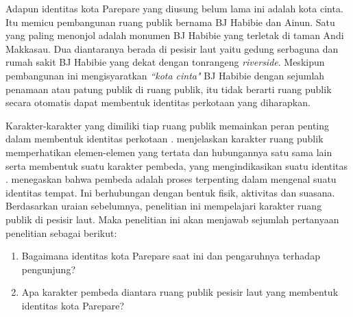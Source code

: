\documentclass[12pt]{simart} %
\begin{document}
Adapun identitas kota Parepare yang diusung belum lama ini adalah kota cinta. Itu memicu pembangunan ruang publik bernama BJ Habibie dan Ainun. Satu yang paling menonjol adalah monumen BJ Habibie yang terletak di taman Andi Makkasau. Dua diantaranya berada di pesisir laut yaitu gedung serbaguna dan rumah sakit BJ Habibie yang dekat dengan tonrangeng \textit{riverside}.
Meskipun pembangunan ini mengisyaratkan \textit{``kota cinta"} BJ Habibie dengan sejumlah penamaan atau patung publik di ruang publik, itu tidak berarti ruang publik secara otomatis dapat membentuk identitas perkotaan yang diharapkan.

Karakter-karakter yang dimiliki tiap ruang publik memainkan peran penting dalam membentuk identitas perkotaan \citep{oktay2002}.
\cite{lynch1984} menjelaskan karakter ruang publik memperhatikan elemen-elemen yang tertata dan hubungannya satu sama lain serta membentuk suatu karakter pembeda,
yang mengindikasikan suatu identitas \citep{hartanti2014}. \cite{hartanti2014} menegaskan bahwa pembeda adalah proses terpenting dalam mengenal suatu identitas tempat. Ini berhubungan dengan  bentuk fisik, aktivitas dan suasana. Berdasarkan uraian sebelumnya, penelitian ini mempelajari karakter ruang publik di pesisir laut. Maka penelitian ini akan menjawab sejumlah pertanyaan penelitian sebagai berikut:

\begin{enumerate}
\item Bagaimana identitas kota Parepare saat ini dan pengaruhnya terhadap pengunjung?
\item Apa karakter pembeda diantara ruang publik pesisir laut yang membentuk identitas kota Parepare?
\end{enumerate}

\begin{comment}
Karakter-karakter tersebut sebaiknya menimbulkan suatu pembeda

Karakter-karakter tiap ruang publik harus memiliki elemen yang sama yang menggambarkan karakter.

Satu diantara

Mereka membangun patung atau monumen bj habibie, memberi nama setiap bangunan dengan bj habibie. akan tetapi karakteristik tidak hanya bermaksud pada penamaan atau bla bla, tetapi pengalaman, makna atau bla bla bla bahkan sense of place.
Meskipun ini bersifat simbolis,
kota seharusnya berisi karakteristik lokal sehingga kota memiliki suatu pembeda.

\end{comment}
\end{document}
